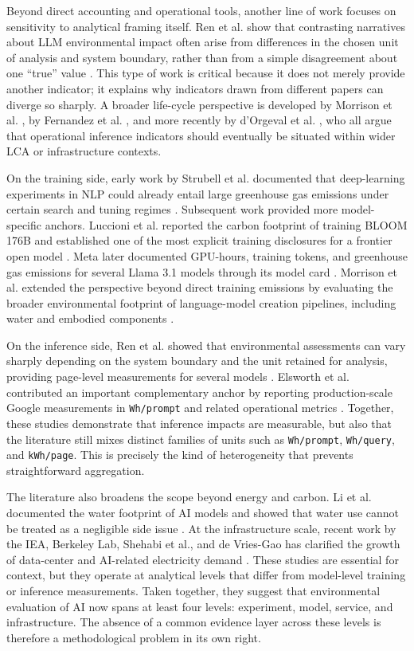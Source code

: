 \documentclass[11pt,a4paper]{article}
\begin{document}
Beyond direct accounting and operational tools, another line of work focuses on sensitivity to analytical framing itself. Ren et al. show that contrasting narratives about LLM environmental impact often arise from differences in the chosen unit of analysis and system boundary, rather than from a simple disagreement about one ``true'' value \cite{ren2024}. This type of work is critical because it does not merely provide another indicator; it explains why indicators drawn from different papers can diverge so sharply. A broader life-cycle perspective is developed by Morrison et al. \cite{morrison2025}, by Fernandez et al. \cite{fernandez2025lca}, and more recently by d'Orgeval et al. \cite{dorgeval2026}, who all argue that operational inference indicators should eventually be situated within wider LCA or infrastructure contexts.

On the training side, early work by Strubell et al. documented that deep-learning experiments in NLP could already entail large greenhouse gas emissions under certain search and tuning regimes \cite{strubell2019}. Subsequent work provided more model-specific anchors. Luccioni et al. reported the carbon footprint of training BLOOM 176B and established one of the most explicit training disclosures for a frontier open model \cite{luccioni2023}. Meta later documented GPU-hours, training tokens, and greenhouse gas emissions for several Llama 3.1 models through its model card \cite{meta2024llama}. Morrison et al. extended the perspective beyond direct training emissions by evaluating the broader environmental footprint of language-model creation pipelines, including water and embodied components \cite{morrison2025}.

On the inference side, Ren et al. showed that environmental assessments can vary sharply depending on the system boundary and the unit retained for analysis, providing page-level measurements for several models \cite{ren2024}. Elsworth et al. contributed an important complementary anchor by reporting production-scale Google measurements in \texttt{Wh/prompt} and related operational metrics \cite{elsworth2025}. Together, these studies demonstrate that inference impacts are measurable, but also that the literature still mixes distinct families of units such as \texttt{Wh/prompt}, \texttt{Wh/query}, and \texttt{kWh/page}. This is precisely the kind of heterogeneity that prevents straightforward aggregation.

The literature also broadens the scope beyond energy and carbon. Li et al. documented the water footprint of AI models and showed that water use cannot be treated as a negligible side issue \cite{li2025water}. At the infrastructure scale, recent work by the IEA, Berkeley Lab, Shehabi et al., and de Vries-Gao has clarified the growth of data-center and AI-related electricity demand \cite{iea2025,shehabi2024report,lbl2025,devriesgao2025joule}. These studies are essential for context, but they operate at analytical levels that differ from model-level training or inference measurements. Taken together, they suggest that environmental evaluation of AI now spans at least four levels: experiment, model, service, and infrastructure. The absence of a common evidence layer across these levels is therefore a methodological problem in its own right.
\end{document}
